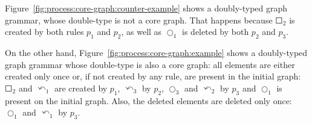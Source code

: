 \begin{example} \mbox{Figure~\ref{fig:process:core-graph:counter-example}} shows a doubly-typed graph grammar, whose double-type is not a core graph. That happens because $\Square_2$ is created by both rules $p_1$ and $p_2$, as well as $\Circle_1$ is deleted by both $p_2$ and $p_3$.

  On the other hand, Figure~\ref{fig:process:core-graph:example} shows a doubly-typed graph grammar whose double-type is also a core graph: all elements are either created only once or, if not created by any rule, are present in the initial graph: $\Square_2$ and $\curvearrowleft_1$ are created by $p_1$, $\curvearrowleft_3$ by $p_2$, $\Circle_3$ and $\curvearrowleft_2$ by $p_3$ and $\Circle_1$ is present on the initial graph. Also, the deleted elements are deleted only once: $\Circle_1$ and
  $\curvearrowleft_1$ by $p_3$.


\end{example}
